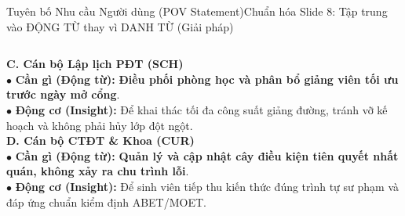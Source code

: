 \documentclass[aspectratio=169, 10pt]{beamer}
\begin{document}
\begin{frame}[t]{Tuyên bố Nhu cầu Người dùng (POV Statement)}{Chuẩn hóa Slide 8: Tập trung vào ĐỘNG TỪ thay vì DANH TỪ (Giải pháp)}
\begin{columns}[T]
      \begin{neutralBox}
        \scriptsize
        \textbf{\color{WarningAmber}C. Cán bộ Lập lịch PĐT (SCH)}\\
        $\bullet$ \textbf{Cần gì (Động từ):} \textbf{Điều phối phòng học và phân bổ giảng viên tối ưu trước ngày mở cổng}.\\
        $\bullet$ \textbf{Động cơ (Insight):} Để khai thác tối đa công suất giảng đường, tránh vỡ kế hoạch và không phải hủy lớp đột ngột.\\[0.1cm]
        \textbf{\color{NavyDark}D. Cán bộ CTĐT \& Khoa (CUR)}\\
        $\bullet$ \textbf{Cần gì (Động từ):} \textbf{Quản lý và cập nhật cây điều kiện tiên quyết nhất quán, không xảy ra chu trình lỗi}.\\
        $\bullet$ \textbf{Động cơ (Insight):} Để sinh viên tiếp thu kiến thức đúng trình tự sư phạm và đáp ứng chuẩn kiểm định ABET/MOET.
      \end{neutralBox}
  \end{columns}
\end{frame}
\end{document}
